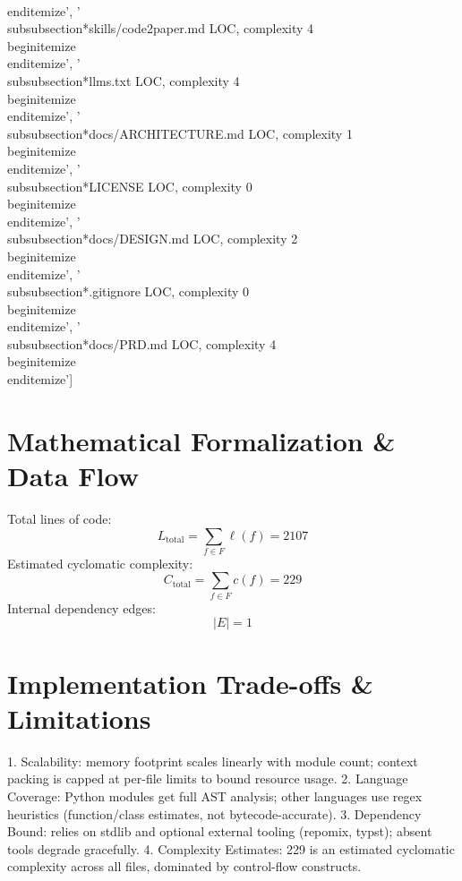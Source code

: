 \documentclass[11pt]{article}
\begin{document}
\n\\end{itemize}', '\\subsubsection*{skills/code2paper.md} LOC, complexity 4\n\\begin{itemize}\n\\end{itemize}', '\\subsubsection*{llms.txt} LOC, complexity 4\n\\begin{itemize}\n\\end{itemize}', '\\subsubsection*{docs/ARCHITECTURE.md} LOC, complexity 1\n\\begin{itemize}\n\\end{itemize}', '\\subsubsection*{LICENSE} LOC, complexity 0\n\\begin{itemize}\n\\end{itemize}', '\\subsubsection*{docs/DESIGN.md} LOC, complexity 2\n\\begin{itemize}\n\\end{itemize}', '\\subsubsection*{.gitignore} LOC, complexity 0\n\\begin{itemize}\n\\end{itemize}', '\\subsubsection*{docs/PRD.md} LOC, complexity 4\n\\begin{itemize}\n\\end{itemize}']

\section{Mathematical Formalization \& Data Flow}
Total lines of code:
\[ L_{\text{total}} = \sum_{f \in F} \ell(f) = 2107 \]
Estimated cyclomatic complexity:
\[ C_{\text{total}} = \sum_{f \in F} c(f) = 229 \]
Internal dependency edges:
\[ |E| = 1 \]

\section{Implementation Trade-offs \& Limitations}
1. Scalability: memory footprint scales linearly with module count; context packing is capped at per-file limits to bound resource usage.
2. Language Coverage: Python modules get full AST analysis; other languages use regex heuristics (function/class estimates, not bytecode-accurate).
3. Dependency Bound: relies on stdlib and optional external tooling (repomix, typst); absent tools degrade gracefully.
4. Complexity Estimates: 229 is an estimated cyclomatic complexity across all files, dominated by control-flow constructs.
\end{document}
